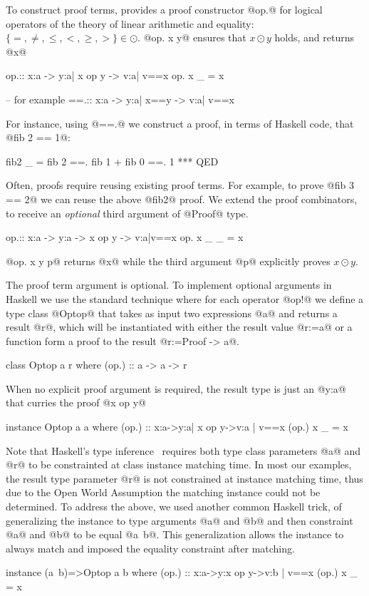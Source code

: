 %
To construct proof terms, \libname
provides a proof constructor @op.@
for logical operators of the theory of
linear arithmetic and equality:
$\{=, \not =, \leq, <, \geq, > \} \in \odot$.
@op. x y@ ensures that $x \odot y$ holds, and returns @x@
%
\begin{code}
  op.:: x:a -> y:{a| x op y} -> {v:a| v==x}
  op. x _ = x

  -- for example
  ==.:: x:a -> y:{a| x==y} -> {v:a| v==x}
\end{code}
%
For instance, using @==.@
we construct a proof, in terms of Haskell code,
that @fib 2 == 1@:
%
\begin{code}
  fib2 _
    =   fib 2
    ==. fib 1 + fib 0
    ==. 1
    *** QED
\end{code} %

%
Often, proofs require reusing existing proof terms.
%
For example, to prove @fib 3 == 2@ we can reuse the above
@fib2@ proof.
%
We extend the proof combinators, to receive
an \textit{optional} third argument of @Proof@ type.
%
\begin{code}
  op.:: x:a -> y:a -> {x op y} -> {v:a|v==x}
  op. x _ _ = x
\end{code}
%
@op. x y p@ returns @x@ while the third argument @p@
explicitly proves $x \odot y$.

%
The proof term argument is optional.
To implement optional arguments in Haskell we use the standard technique
where for each operator @op!@ we define a type class @Optop@
that takes as input two expressions @a@ and returns a result @r@,
which will be instantiated with either the result value @r:=a@
or a function form a proof to the result @r:=Proof ->  a@.
%
\begin{code}
  class Optop a r where
    (op.) :: a -> a -> r
\end{code}
%
When no explicit proof argument is required,
the result type is just an @y:a@ that curries the proof @x op y@
%
\begin{code}
  instance Optop a a where
  (op.) :: x:a->y:{a| x op y}->{v:a | v==x }
  (op.) x _ = x
\end{code}
%
Note that Haskell's type inference~\citep{Sulzmann06}
requires both type class parameters @a@ and @r@ to be constrainted at class instance
matching time.
%
In most our examples, the result type parameter @r@ is not constrained
at instance matching time, thus
due to the Open World Assumption
the matching instance could not be determined.
%
To address the above, we used another common Haskell trick,
of generalizing the instance to type arguments @a@ and @b@ and then
constraint @a@ and @b@ to be equal @a~b@.
%
This generalization allows the instance to always match and
imposed the equality constraint after matching.
%
\begin{code}
  instance (a~b)=>Optop a b where
  (op.) :: x:a->y:{x op y}->{v:b | v==x }
  (op.) x _ = x
\end{code}



